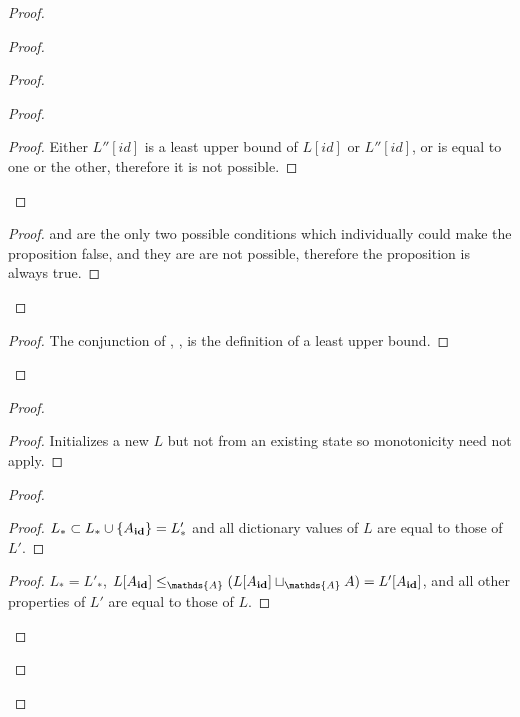 \documentclass[9pt]{article}   	%
\begin{document}
\begin{proof}
\begin{proof}
\begin{proof}
\begin{proof}
				\qedstep
				\begin{proof}
					Either $L''[id]$ is a least upper bound of $L[id]$ or $L''[id]$, or is equal to one or the other, therefore it is not possible.
				\end{proof}
			\end{proof}
			
			\qedstep
			\begin{proof}
				  and  are the only two possible conditions which individually could make the proposition false, and they are are not possible, therefore the proposition is always true. 
			\end{proof}
		\end{proof}
		
	
		\qedstep
		\begin{proof}
			The conjunction of , ,  is the definition of a least upper bound.
		\end{proof}
	\end{proof}

	\begin{proof}
		\begin{proof}
			Initializes a new $L$ but not from an existing state so monotonicity need not apply.
		\end{proof}
		
		\begin{proof}
			\begin{proof}
				$L_* \subset L_* \cup \{ A_{\scriptsize \textbf{id}} \} = L'_*$ and all dictionary values of $L$ are equal to those of $L'$.
			\end{proof}
			
			\begin{proof}
				$L_* = L'_*$, $L[A_{\scriptsize \textbf{id}}] \leq_\mathds{A} (L[A_{\scriptsize \textbf{id}}] \sqcup_\mathds{A} A) =  L'[A_{\scriptsize \textbf{id}}]$, and all other properties of $L'$ are equal to those of $L$.
			\end{proof}
		\end{proof}
			

\end{proof}
\end{proof}
\end{document}
